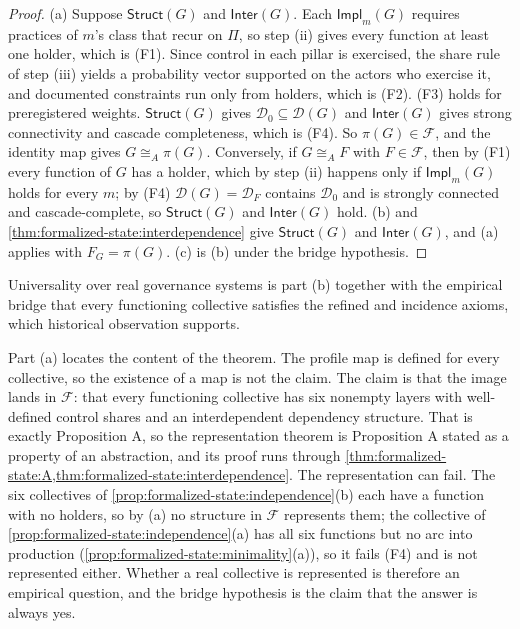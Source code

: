 \documentclass[11pt,letterpaper]{article}
\theoremstyle{definition}
\theoremstyle{remark}
\newcommand{\Struct}{\mathsf{Struct}}
\newcommand{\Inter}{\mathsf{Inter}}
\newcommand{\Impl}{\mathsf{Impl}}
\newcommand{\Dzero}{\mathcal{D}_0}
\begin{document}
\begin{proof}
(a) Suppose $\Struct(G)$ and $\Inter(G)$. Each $\Impl_m(G)$ requires practices of $m$'s class that recur on $\Pi$, so step (ii) gives every function at least one holder, which is (F1). Since control in each pillar is exercised, the share rule of step (iii) yields a probability vector supported on the actors who exercise it, and documented constraints run only from holders, which is (F2). (F3) holds for preregistered weights. $\Struct(G)$ gives $\Dzero\subseteq\mathcal{D}(G)$ and $\Inter(G)$ gives strong connectivity and cascade completeness, which is (F4). So $\pi(G)\in\mathcal{F}$, and the identity map gives $G\cong_A\pi(G)$. Conversely, if $G\cong_AF$ with $F\in\mathcal{F}$, then by (F1) every function of $G$ has a holder, which by step (ii) happens only if $\Impl_m(G)$ holds for every $m$; by (F4) $\mathcal{D}(G)=\mathcal{D}_F$ contains $\Dzero$ and is strongly connected and cascade-complete, so $\Struct(G)$ and $\Inter(G)$ hold. (b)  and \cref{thm:formalized-state:interdependence} give $\Struct(G)$ and $\Inter(G)$, and (a) applies with $F_G=\pi(G)$. (c) is (b) under the bridge hypothesis.
\end{proof}

Universality over real governance systems is part (b) together with the empirical bridge that every functioning collective satisfies the refined and incidence axioms, which historical observation supports.

Part (a) locates the content of the theorem. The profile map is defined for every collective, so the existence of a map is not the claim. The claim is that the image lands in $\mathcal{F}$: that every functioning collective has six nonempty layers with well-defined control shares and an interdependent dependency structure. That is exactly Proposition A, so the representation theorem is Proposition A stated as a property of an abstraction, and its proof runs through \cref{thm:formalized-state:A,thm:formalized-state:interdependence}. The representation can fail. The six collectives of \cref{prop:formalized-state:independence}(b) each have a function with no holders, so by (a) no structure in $\mathcal{F}$ represents them; the collective of \cref{prop:formalized-state:independence}(a) has all six functions but no arc into production (\cref{prop:formalized-state:minimality}(a)), so it fails (F4) and is not represented either. Whether a real collective is represented is therefore an empirical question, and the bridge hypothesis is the claim that the answer is always yes.
\end{document}
